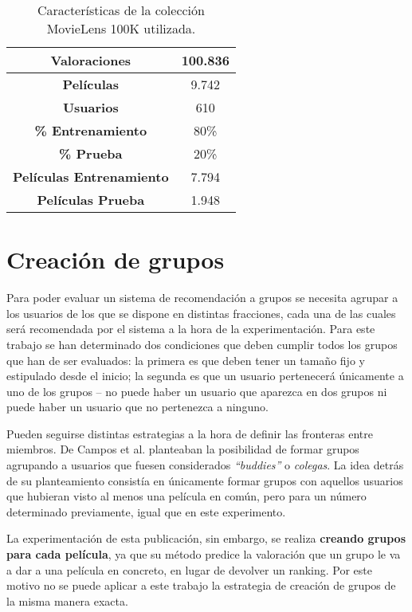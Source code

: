 \begin{table}[H]
	\centering
	\begin{tabular}{|c|c|}
		\hline
		\textbf{Valoraciones}            & 100.836 \\ \hline
		\textbf{Películas}               & 9.742   \\ \hline
		\textbf{Usuarios}                & 610     \\ \hline
		\textbf{\% Entrenamiento}        & 80\%    \\ \hline
		\textbf{\% Prueba}               & 20\%    \\ \hline
		\textbf{Películas Entrenamiento} & 7.794   \\ \hline
		\textbf{Películas Prueba}        & 1.948   \\ \hline
	\end{tabular}
	\caption{Características de la colección MovieLens 100K utilizada.}
	\label{caracteristicas-movielens}
\end{table}

\section{Creación de grupos}

Para poder evaluar un sistema de recomendación a grupos se necesita agrupar a los usuarios de los que se dispone en distintas fracciones, cada una de las cuales será recomendada por el sistema a la hora de la experimentación. Para este trabajo se han determinado dos condiciones que deben cumplir todos los grupos que han de ser evaluados: la primera es que deben tener un tamaño fijo y estipulado desde el inicio; la segunda es que un usuario pertenecerá únicamente a uno de los grupos -- no puede haber un usuario que aparezca en dos grupos ni puede haber un usuario que no pertenezca a ninguno.

Pueden seguirse distintas estrategias a la hora de definir las fronteras entre miembros. De Campos et al. \cite{umuai} planteaban la posibilidad de formar grupos agrupando a usuarios que fuesen considerados \textit{``buddies''} o \textit{colegas}. La idea detrás de su planteamiento consistía en únicamente formar grupos con aquellos usuarios que hubieran visto al menos una película en común, pero para un número determinado previamente, igual que en este experimento.

La experimentación de esta publicación, sin embargo, se realiza \textbf{creando grupos para cada película}, ya que su método predice la valoración que un grupo le va a dar a una película en concreto, en lugar de devolver un ranking. Por este motivo no se puede aplicar a este trabajo la estrategia de creación de grupos de la misma manera exacta.

